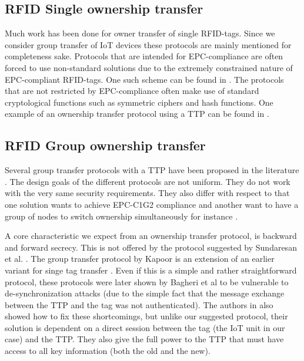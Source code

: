 {\subsection{RFID Single ownership transfer}
Much work has been done for owner transfer of single RFID-tags. Since we consider group transfer of IoT devices these protocols are mainly mentioned for completeness sake. Protocols that are intended for EPC-compliance are often forced to use non-standard solutions due to the extremely constrained nature of EPC-compliant RFID-tags. One such scheme can be found in \cite{CAO201647}. 
The protocols that are not restricted by EPC-compliance often make use of standard cryptological functions such as symmetric ciphers and hash functions. One example of an ownership transfer protocol using a TTP can be found in \cite{zhou2012simultaneous}.



\subsection{RFID Group ownership transfer}
Several group transfer protocols with a TTP have been proposed in the literature \cite{kapoor2011multi} \cite{zuo2010changing}  \cite{SUNDARESAN2015112} \cite{He2014} \cite{BagheriAS18}. The design goals of the different protocols are not uniform. They do not work with the very same security requirements. They also differ with respect to that one solution wants to achieve EPC-C1G2 compliance \cite{SUNDARESAN2015112} and another want to have a group of nodes to switch ownership simultaneously for instance \cite{zuo2010changing}.

A core characteristic we expect from an ownership transfer protocol, is backward and forward secrecy. This is not offered by the protocol suggested by Sundaresan et al. \cite{SUNDARESAN2015112}. The group transfer protocol by Kapoor \cite{kapoor2011multi} is an extension of an earlier variant for singe tag transfer \cite{Kapoor2008}. Even if this is a simple and rather straightforward protocol, these protocols were later shown by Bagheri et al \cite{BagheriAS18} to be vulnerable to de-synchronization attacks (due to the simple fact that the message exchange between the TTP and the tag was not authenticated). The authors in \cite{BagheriAS18} also showed how to fix these shortcomings, but unlike our suggested protocol, their solution is dependent on a direct session between the tag (the IoT unit in our case) and the TTP. They also give the full power to the TTP that must have access to all key information (both the old and the new).

}
